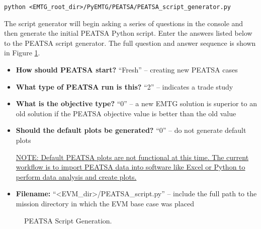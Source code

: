 \documentclass[11pt]{article}
\makeatletter
\newcommand{\knownissuelabel}[2]
{
	 \phantomsection
  	\hyperref[#2_h]{#1}\def\@currentlabel{\unexpanded{#1}}\label{#2_b}
}
\makeatother
\begin{document}
\texttt{python <EMTG\_root\_dir>/PyEMTG/PEATSA/PEATSA\_script\_generator.py}

\noindent The script generator will begin asking a series of questions in the console and then generate the initial \ac{PEATSA} Python script. Enter the answers listed below to the \ac{PEATSA} script generator. The full question and answer sequence is shown in Figure \ref{fig:script_generation}.

\begin{itemize}
	\item\textbf{How should PEATSA start?} ``Fresh'' -- creating new \ac{PEATSA} cases
	\item\textbf{What type of PEATSA run is this?} ``2'' -- indicates a trade study
	\item\textbf{What is the objective type?} ``0'' -- a new \ac{EMTG} solution is superior to an old solution if the \ac{PEATSA} objective value is better than the old value
	\item\textbf{Should the default plots be generated?} ``0'' -- do not generate default plots

\knownissuelabel{NOTE: Default \ac{PEATSA} plots are not functional at this time. The current workflow is to import \ac{PEATSA} data into software like Excel or Python to perform data analysis and create plots.}{peatsa_plots_issue}
	
	\item\textbf{Filename:} ``\textless EVM\_dir\textgreater /PEATSA\_script.py'' -- include the full path to the mission directory in which the EVM base case was placed
\end{itemize}

\begin{figure}
	\centering
	\caption{\label{fig:script_generation}\ac{PEATSA} Script Generation.}
\end{figure}
\end{document}
